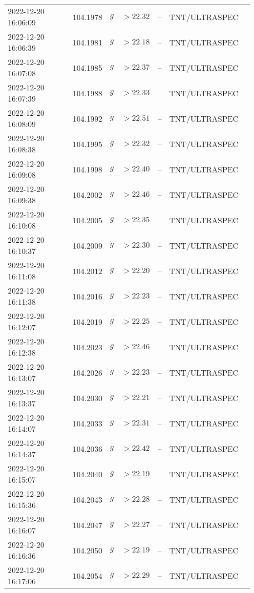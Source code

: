 \documentclass{nature_plusfigure}
\begin{document}
\begin{supplement}
\begin{center}
\begin{longtable}{lllllll}
2022-12-20 16:06:09 & 104.1978 & $g$ & $>22.32$ & -- & TNT/ULTRASPEC &  \\ 
2022-12-20 16:06:39 & 104.1981 & $g$ & $>22.18$ & -- & TNT/ULTRASPEC &  \\ 
2022-12-20 16:07:08 & 104.1985 & $g$ & $>22.37$ & -- & TNT/ULTRASPEC &  \\ 
2022-12-20 16:07:39 & 104.1988 & $g$ & $>22.33$ & -- & TNT/ULTRASPEC &  \\ 
2022-12-20 16:08:09 & 104.1992 & $g$ & $>22.51$ & -- & TNT/ULTRASPEC &  \\ 
2022-12-20 16:08:38 & 104.1995 & $g$ & $>22.32$ & -- & TNT/ULTRASPEC &  \\ 
2022-12-20 16:09:08 & 104.1998 & $g$ & $>22.40$ & -- & TNT/ULTRASPEC &  \\ 
2022-12-20 16:09:38 & 104.2002 & $g$ & $>22.46$ & -- & TNT/ULTRASPEC &  \\ 
2022-12-20 16:10:08 & 104.2005 & $g$ & $>22.35$ & -- & TNT/ULTRASPEC &  \\ 
2022-12-20 16:10:37 & 104.2009 & $g$ & $>22.30$ & -- & TNT/ULTRASPEC &  \\ 
2022-12-20 16:11:08 & 104.2012 & $g$ & $>22.20$ & -- & TNT/ULTRASPEC &  \\ 
2022-12-20 16:11:38 & 104.2016 & $g$ & $>22.23$ & -- & TNT/ULTRASPEC &  \\ 
2022-12-20 16:12:07 & 104.2019 & $g$ & $>22.25$ & -- & TNT/ULTRASPEC &  \\ 
2022-12-20 16:12:38 & 104.2023 & $g$ & $>22.46$ & -- & TNT/ULTRASPEC &  \\ 
2022-12-20 16:13:07 & 104.2026 & $g$ & $>22.23$ & -- & TNT/ULTRASPEC &  \\ 
2022-12-20 16:13:37 & 104.2030 & $g$ & $>22.21$ & -- & TNT/ULTRASPEC &  \\ 
2022-12-20 16:14:07 & 104.2033 & $g$ & $>22.31$ & -- & TNT/ULTRASPEC &  \\ 
2022-12-20 16:14:37 & 104.2036 & $g$ & $>22.42$ & -- & TNT/ULTRASPEC &  \\ 
2022-12-20 16:15:07 & 104.2040 & $g$ & $>22.19$ & -- & TNT/ULTRASPEC &  \\ 
2022-12-20 16:15:36 & 104.2043 & $g$ & $>22.28$ & -- & TNT/ULTRASPEC &  \\ 
2022-12-20 16:16:07 & 104.2047 & $g$ & $>22.27$ & -- & TNT/ULTRASPEC &  \\ 
2022-12-20 16:16:36 & 104.2050 & $g$ & $>22.19$ & -- & TNT/ULTRASPEC &  \\ 
2022-12-20 16:17:06 & 104.2054 & $g$ & $>22.29$ & -- & TNT/ULTRASPEC &  \\ 

\end{longtable}
\end{center}
\end{supplement}
\end{document}
